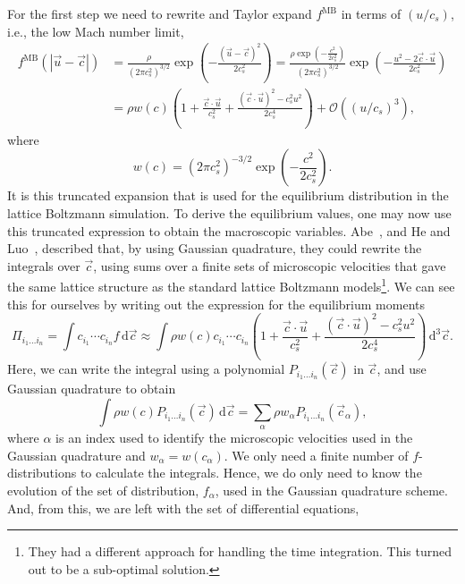 \documentclass[11pt,a4paper]{report}
\begin{document}
For the first step we need to rewrite and Taylor expand $f^\mathrm{MB}$ in terms of $(u/c_s)$, i.e., the low Mach number limit, 
\begin{align*}
f^\mathrm{MB}(|\vec{u}-\vec{c}|) &= \frac{\rho}{(2\pi c_s^2)^{3/2}}\exp\left({-\frac{(\vec{u}-\vec{c})^2}{2c_s^2}}\right) = \frac{\rho \exp\left({-\frac{c^2}{2c_s^2}}\right)}{(2\pi c_s^2)^{3/2}}\exp\left({-\frac{u^2 -2\vec{c}\cdot\vec{u}}{2c_s^2}}\right) \\
&= \rho w(c)\left(1 + \frac{\vec{c}\cdot\vec{u}}{c_s^2} + \frac{(\vec{c}\cdot\vec{u})^2 - c_s^2u^2}{2c_s^4}\right) + \mathcal{O}\left((u/c_s)^3\right),
\end{align*}
where
\begin{equation*}
w(c) = (2\pi c_s^2)^{-3/2}\exp\left({-\frac{c^2}{2c_s^2}}\right).
\end{equation*}
It is this truncated expansion that is used for the equilibrium distribution in the lattice Boltzmann simulation. To derive the equilibrium values, one may now use this truncated expression to obtain the macroscopic variables. Abe~\cite{abe_derivation_1997}, and He and Luo~\cite{he_priori_1997,he_theory_1997}, described that, by using Gaussian quadrature, they could rewrite the integrals over $\vec{c}$, using sums over a finite sets of microscopic velocities that gave the same lattice structure as the standard lattice Boltzmann models\footnote{They had a different approach for handling the time integration. This turned out to be a sub-optimal solution.}. We can see this for ourselves by writing out the expression for the equilibrium moments 
\begin{equation}
\Pi_{i_1\dots i_n} = \int  c_{i_1}\cdots c_{i_n}f\,\mathrm{d}\vec{ c} \approx \int  \rho w(c)c_{i_1}\cdots c_{i_n}
\left(1 + \frac{\vec{c}\cdot\vec{u}}{c_s^2} + \frac{(\vec{c}\cdot\vec{u})^2 - c_s^2u^2}{2c_s^4}\right)
\,\mathrm{d}^3\vec{ c}.
\end{equation}     
Here, we can write the integral using a polynomial $P_{i_1\dots i_n}(\vec{c})$ in $\vec{c}$, and use Gaussian quadrature to obtain
\begin{equation}
\int  \rho w(c)P_{i_1\dots i_n}(\vec{c})\,\mathrm{d}\vec{ c} = \sum_\alpha \rho w_\alpha P_{i_1\dots i_n}(\vec{c}_\alpha),
\end{equation}
where $\alpha$ is an index used to identify the microscopic velocities used in the Gaussian quadrature and $w_\alpha = w(c_\alpha)$.  We only need a finite number of $f$-distributions to calculate the integrals. Hence, we do only need to know the evolution of the set of distribution, $f_\alpha$, used in the Gaussian quadrature scheme. And, from this, we are left with the set of differential equations,
\end{document}
